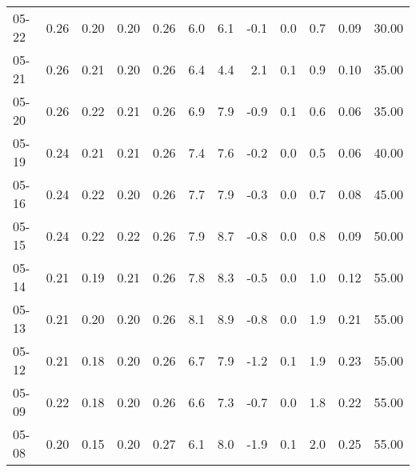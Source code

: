 \begin{threeparttable}
{\begin{tabular}{lrrrrrrrrrrr}
  05-22 &          0.26 &          0.20 &          0.20 &        0.26 &                 6.0 &                 6.1 &       -0.1 &                 0.0 &              0.7 &            0.09 &                  30.00 \\
  05-21 &          0.26 &          0.21 &          0.20 &        0.26 &                 6.4 &                 4.4 &        2.1 &                 0.1 &              0.9 &            0.10 &                  35.00 \\
  05-20 &          0.26 &          0.22 &          0.21 &        0.26 &                 6.9 &                 7.9 &       -0.9 &                 0.1 &              0.6 &            0.06 &                  35.00 \\
  05-19 &          0.24 &          0.21 &          0.21 &        0.26 &                 7.4 &                 7.6 &       -0.2 &                 0.0 &              0.5 &            0.06 &                  40.00 \\
  05-16 &          0.24 &          0.22 &          0.20 &        0.26 &                 7.7 &                 7.9 &       -0.3 &                 0.0 &              0.7 &            0.08 &                  45.00 \\
  05-15 &          0.24 &          0.22 &          0.22 &        0.26 &                 7.9 &                 8.7 &       -0.8 &                 0.0 &              0.8 &            0.09 &                  50.00 \\
  05-14 &          0.21 &          0.19 &          0.21 &        0.26 &                 7.8 &                 8.3 &       -0.5 &                 0.0 &              1.0 &            0.12 &                  55.00 \\
  05-13 &          0.21 &          0.20 &          0.20 &        0.26 &                 8.1 &                 8.9 &       -0.8 &                 0.0 &              1.9 &            0.21 &                  55.00 \\
  05-12 &          0.21 &          0.18 &          0.20 &        0.26 &                 6.7 &                 7.9 &       -1.2 &                 0.1 &              1.9 &            0.23 &                  55.00 \\
  05-09 &          0.22 &          0.18 &          0.20 &        0.26 &                 6.6 &                 7.3 &       -0.7 &                 0.0 &              1.8 &            0.22 &                  55.00 \\
  05-08 &          0.20 &          0.15 &          0.20 &        0.27 &                 6.1 &                 8.0 &       -1.9 &                 0.1 &              2.0 &            0.25 &                  55.00 \\

\end{tabular}}
\end{threeparttable}
